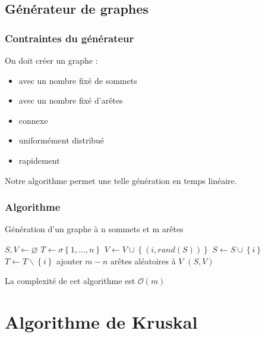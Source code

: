 \documentclass{beamer}
\begin{document}
		\subsection{Générateur de graphes}
			\begin{frame}
				\frametitle{Contraintes du générateur}
				On doit créer un graphe :
				\begin{itemize}
					\item avec un nombre fixé de sommets \pause
					\item avec un nombre fixé d'arêtes \pause
					\item connexe \pause
					\item uniformément distribué \pause
					\item rapidement \pause
				\end{itemize}
				Notre algorithme permet une telle génération en temps linéaire.
			\end{frame}
			\begin{frame}
				\frametitle{Algorithme}
				
				\begin{algorithm}[H]
					\caption{Génération d'un graphe à n sommets
					et m arêtes}
					\begin{algorithmic}[H]
						\STATE $S,V \leftarrow \varnothing$
						\STATE $T \leftarrow \sigma\left\{1,...,n\right\}$
						\FOR {$i \in T$}
						\STATE $V \leftarrow V\cup\left\{(i,rand(S))\right\}$
						\STATE $S \leftarrow S\cup\left\{i\right\}$
						\STATE $T \leftarrow T\backslash\left\{i\right\}$
						\ENDFOR
						\STATE ajouter $m-n$ arêtes aléatoires à $V$
						\RETURN $(S,V)$
					\end{algorithmic}
				\end{algorithm}
				\pause
				La complexité de cet algorithme est $\mathcal{O}(m)$
			\end{frame}

	\section{Algorithme de Kruskal}
\end{document}
